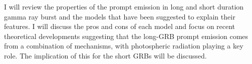 


\bigskip



\bigskip

\noindent I will review the properties of the prompt emission in long and short duration gamma ray burst and the models that have been suggested to explain their features. I will discuss the pros and cons of each model and focus on recent theoretical developments suggesting that the long-GRB prompt emission comes from a combination of mechanisms, with photospheric radiation playing a key role. The implication of this for the short GRBs will be discussed.
